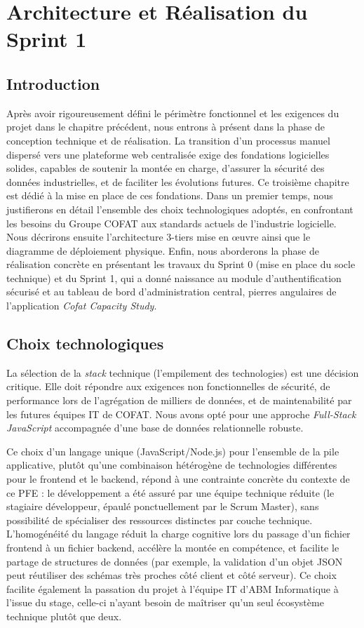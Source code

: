 \chapter{Architecture et Réalisation du Sprint 1}
\label{chap:architecture_sprint1}

\section{Introduction}
Après avoir rigoureusement défini le périmètre fonctionnel et les exigences du projet dans le chapitre précédent, nous entrons à présent dans la phase de conception technique et de réalisation. La transition d'un processus manuel dispersé vers une plateforme web centralisée exige des fondations logicielles solides, capables de soutenir la montée en charge, d'assurer la sécurité des données industrielles, et de faciliter les évolutions futures. Ce troisième chapitre est dédié à la mise en place de ces fondations. Dans un premier temps, nous justifierons en détail l'ensemble des choix technologiques adoptés, en confrontant les besoins du Groupe COFAT aux standards actuels de l'industrie logicielle. Nous décrirons ensuite l'architecture 3-tiers mise en œuvre ainsi que le diagramme de déploiement physique. Enfin, nous aborderons la phase de réalisation concrète en présentant les travaux du Sprint 0 (mise en place du socle technique) et du Sprint 1, qui a donné naissance au module d'authentification sécurisé et au tableau de bord d'administration central, pierres angulaires de l'application \textit{Cofat Capacity Study}.

\section{Choix technologiques}
La sélection de la \textit{stack} technique (l'empilement des technologies) est une décision critique. Elle doit répondre aux exigences non fonctionnelles de sécurité, de performance lors de l'agrégation de milliers de données, et de maintenabilité par les futures équipes IT de COFAT. Nous avons opté pour une approche \textit{Full-Stack JavaScript} accompagnée d'une base de données relationnelle robuste.

Ce choix d'un langage unique (JavaScript/Node.js) pour l'ensemble de la pile applicative, plutôt qu'une combinaison hétérogène de technologies différentes pour le frontend et le backend, répond à une contrainte concrète du contexte de ce PFE : le développement a été assuré par une équipe technique réduite (le stagiaire développeur, épaulé ponctuellement par le Scrum Master), sans possibilité de spécialiser des ressources distinctes par couche technique. L'homogénéité du langage réduit la charge cognitive lors du passage d'un fichier frontend à un fichier backend, accélère la montée en compétence, et facilite le partage de structures de données (par exemple, la validation d'un objet JSON peut réutiliser des schémas très proches côté client et côté serveur). Ce choix facilite également la passation du projet à l'équipe IT d'ABM Informatique à l'issue du stage, celle-ci n'ayant besoin de maîtriser qu'un seul écosystème technique plutôt que deux.

